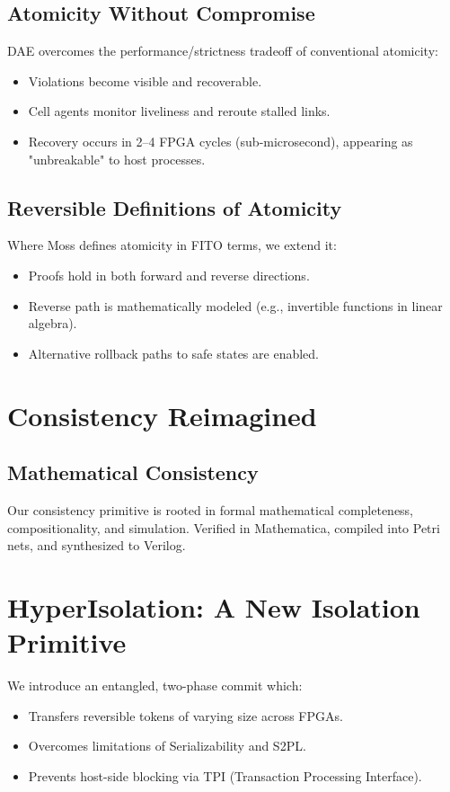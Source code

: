\subsection{Atomicity Without Compromise}
DAE overcomes the performance/strictness tradeoff of conventional atomicity:
\begin{itemize}
  \item Violations become visible and recoverable.
  \item Cell agents monitor liveliness and reroute stalled links.
  \item Recovery occurs in 2–4 FPGA cycles (sub-microsecond), appearing as "unbreakable" to host processes.
\end{itemize}

\subsection{Reversible Definitions of Atomicity}
Where Moss defines atomicity in FITO terms, we extend it:
\begin{itemize}
  \item Proofs hold in both forward and reverse directions.
  \item Reverse path is mathematically modeled (e.g., invertible functions in linear algebra).
  \item Alternative rollback paths to safe states are enabled.
\end{itemize}

\section{Consistency Reimagined}

\subsection{Mathematical Consistency}
Our consistency primitive is rooted in formal mathematical completeness, compositionality, and simulation. Verified in Mathematica, compiled into Petri nets, and synthesized to Verilog.

\section{HyperIsolation: A New Isolation Primitive}
We introduce an entangled, two-phase commit which:
\begin{itemize}
  \item Transfers reversible tokens of varying size across FPGAs.
  \item Overcomes limitations of Serializability and S2PL.
  \item Prevents host-side blocking via TPI (Transaction Processing Interface).
\end{itemize}

